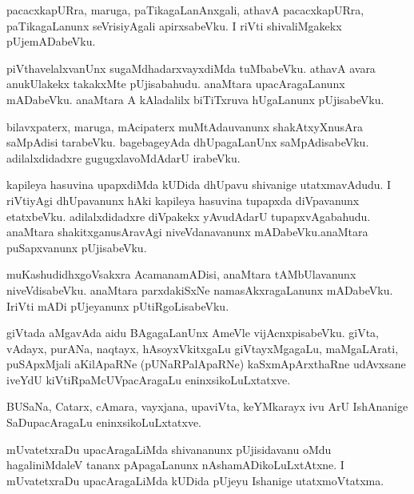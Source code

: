 \documentclass{article}
\begin{document}
\begin{mn}
pacacxkapURra,  maruga,  paTikagaLanAnxgali,  athavA  pacacxkapURra,  paTikagaLanunx  seVrisiyAgali  
apirxsabeVku.  I riVti  shivaliMgakekx  pUjemADabeVku.
\end{mn}

\begin{mn}
piVthavelalxvanUnx  sugaMdhadarxvayxdiMda  tuMbabeVku.  athavA  avara  anukUlakekx  takakxMte  pUjisabahudu.  
anaMtara  upacAragaLanunx  mADabeVku.  anaMtara  A  kAladalilx  biTiTxruva  hUgaLanunx  pUjisabeVku.
\end{mn}

\begin{mn}
bilavxpaterx,  maruga,  mAcipaterx  muMtAdauvanunx  shakAtxyXnusAra  saMpAdisi  tarabeVku.  bagebageyAda  
dhUpagaLanUnx  saMpAdisabeVku.  adilalxdidadxre  gugugxlavoMdAdarU  irabeVku.
\end{mn}

\begin{mn}
kapileya  hasuvina  upapxdiMda  kUDida  dhUpavu  shivanige  utatxmavAdudu.  I riVtiyAgi  dhUpavanunx  hAki    
kapileya  hasuvina  tupapxda  diVpavanunx  etatxbeVku.  adilalxdidadxre  diVpakekx  yAvudAdarU  tupapxvAgabahudu.    
anaMtara  shakitxganusAravAgi  niveVdanavanunx  mADabeVku.anaMtara  puSapxvanunx  pUjisabeVku.
\end{mn}

\begin{mn}
muKashudidhxgoVsakxra  AcamanamADisi,  anaMtara  tAMbUlavanunx  niveVdisabeVku.  anaMtara  parxdakiSxNe  
namasAkxragaLanunx  mADabeVku.  IriVti  mADi  pUjeyanunx  pUtiRgoLisabeVku.
\end{mn}

\begin{mn}
giVtada  aMgavAda  aidu  BAgagaLanUnx  AmeVle  vijAcnxpisabeVku.  giVta,  vAdayx,  purANa,  naqtayx,  
hAsoyxVkitxgaLu  giVtayxMgagaLu,  maMgaLArati,  puSApxMjali  aKilApaRNe (pUNaRPalApaRNe) kaSxmApArxthaRne  
udAvxsane  iveYdU  kiVtiRpaMcUVpacAragaLu  eninxsikoLuLxtatxve.
\end{mn}

\begin{mn}
BUSaNa,  Catarx,  cAmara,  vayxjana,  upaviVta,  keYMkarayx  ivu  ArU  IshAnanige  SaDupacAragaLu  eninxsikoLuLxtatxve.
\end{mn}

\begin{mn}
mUvatetxraDu  upacAragaLiMda  shivananunx  pUjisidavanu  oMdu  hagaliniMdaleV  tananx  pApagaLanunx   
nAshamADikoLuLxtAtxne.  I  mUvatetxraDu  upacAragaLiMda  kUDida  pUjeyu  Ishanige  utatxmoVtatxma.
\end{mn}
\end{document}
